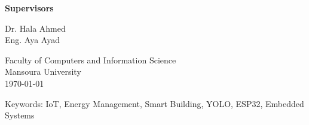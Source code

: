 \begin{titlepage}
	\vfill

	{\normalsize\bfseries Supervisors}

	\vspace{0.1cm}

	{\normalsize Dr. Hala Ahmed \\
	Eng. Aya Ayad \par}

	\vfill

	{\normalsize Faculty of Computers and Information Science \\
		Mansoura University \\
		\today}

	\vfill

	{\small Keywords: IoT, Energy Management, Smart Building, YOLO, ESP32, Embedded Systems}

\end{titlepage}
